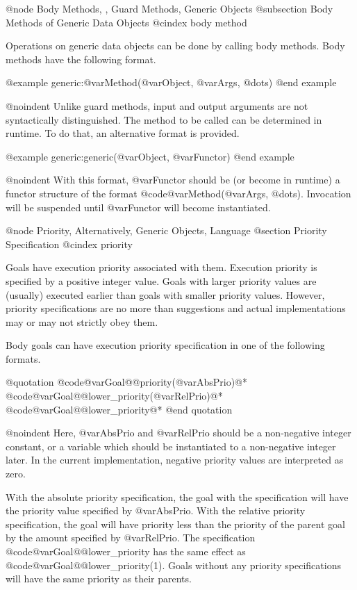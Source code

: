@node Body Methods,  , Guard Methods, Generic Objects
@subsection Body Methods of Generic Data Objects
@cindex body method

Operations on generic data objects can be done by calling body methods.
Body methods have the following format.

@example
generic:@var{Method}(@var{Object}, @var{Args}, @dots{})
@end example

@noindent
Unlike guard methods, input and output arguments are not syntactically
distinguished.  The method to be called can be determined in runtime.
To do that, an alternative format is provided.

@example
generic:generic(@var{Object}, @var{Functor})
@end example

@noindent
With this format, @var{Functor} should be (or become in runtime) a
functor structure of the format @code{@var{Method}(@var{Args}, @dots{})}.
Invocation will be suspended until @var{Functor} will become
instantiated.

@node Priority, Alternatively, Generic Objects, Language
@section Priority Specification
@cindex priority

Goals have execution priority associated with them.  Execution priority
is specified by a positive integer value.  Goals with larger priority
values are (usually) executed earlier than goals with smaller priority
values.  However, priority specifications are no more than suggestions
and actual implementations may or may not strictly obey them.

Body goals can have execution priority specification in one of the
following formats.

@quotation
        @code{@var{Goal}@@priority(@var{AbsPrio})}@*
        @code{@var{Goal}@@lower_priority(@var{RelPrio})}@*
        @code{@var{Goal}@@lower_priority}@*
@end quotation

@noindent
Here, @var{AbsPrio} and @var{RelPrio} should be a non-negative integer
constant, or a variable which should be instantiated to a non-negative
integer later.  In the current implementation, negative priority values
are interpreted as zero.

With the absolute priority specification, the goal with the
specification will have the priority value specified by @var{AbsPrio}.
With the relative priority specification, the goal will have priority
less than the priority of the parent goal by the amount specified by
@var{RelPrio}.  The specification @code{@var{Goal}@@lower_priority} has
the same effect as @code{@var{Goal}@@lower_priority(1)}.  Goals without
any priority specifications will have the same priority as their
parents.

